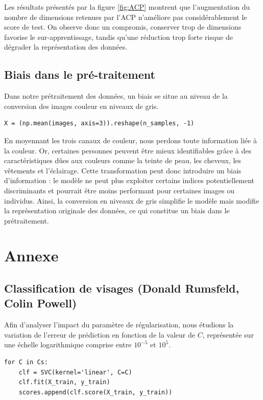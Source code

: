 \documentclass[a4paper,12pt]{article}
\begin{document}
Les résultats présentés par la figure \ref{fig:ACP} montrent que l’augmentation du nombre de dimensions retenues par l’ACP n'améliore pas considérablement le score de test. On observe donc un compromis, conserver trop de dimensions favorise le sur-apprentissage, tandis qu’une réduction trop forte risque de dégrader la représentation des données.

\subsection{Biais dans le pré-traitement}

Dans notre prétraitement des données, un biais se situe au niveau de la conversion des images couleur en niveaux de gris.

\begin{verbatim}
X = (np.mean(images, axis=3)).reshape(n_samples, -1)
\end{verbatim}

En moyennant les trois canaux de couleur, nous perdons toute information liée à la couleur. Or, certaines personnes peuvent être mieux identifiables grâce à des caractéristiques dûes aux couleurs comme la teinte de peau, les cheveux, les vêtements et l'éclairage. Cette transformation peut donc introduire un biais d’information : le modèle ne peut plus exploiter certains indices potentiellement discriminants et pourrait être moins performant pour certaines images ou individus.
Ainsi, la conversion en niveaux de gris simplifie le modèle mais modifie la représentation originale des données, ce qui constitue un biais dans le prétraitement.

\section{Annexe}

\subsection{Classification de visages (Donald Rumsfeld, Colin Powell)}

Afin d’analyser l’impact du paramètre de régularisation, nous étudions la variation de l’erreur de prédiction en fonction de la valeur de $C$, représentée sur une échelle logarithmique comprise entre $10^{-5}$ et $10^{5}$.


\begin{verbatim}
for C in Cs:
    clf = SVC(kernel='linear', C=C)
    clf.fit(X_train, y_train)   
    scores.append(clf.score(X_train, y_train))
\end{verbatim}
\end{document}
